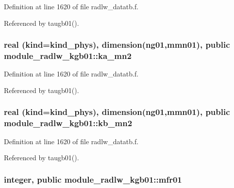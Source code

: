 Definition at line 1620 of file radlw\+\_\+datatb.\+f.



Referenced by taugb01().

\subsubsection[{\texorpdfstring{ka\+\_\+mn2}{ka_mn2}}]{\setlength{\rightskip}{0pt plus 5cm}real (kind=kind\+\_\+phys), dimension(ng01,{\bf mmn01}), public module\+\_\+radlw\+\_\+kgb01\+::ka\+\_\+mn2}\hypertarget{namespacemodule__radlw__kgb01_a0a4f08c625f2f25f132200811af42331}{}\label{namespacemodule__radlw__kgb01_a0a4f08c625f2f25f132200811af42331}


Definition at line 1620 of file radlw\+\_\+datatb.\+f.



Referenced by taugb01().

\subsubsection[{\texorpdfstring{kb\+\_\+mn2}{kb_mn2}}]{\setlength{\rightskip}{0pt plus 5cm}real (kind=kind\+\_\+phys), dimension(ng01,{\bf mmn01}), public module\+\_\+radlw\+\_\+kgb01\+::kb\+\_\+mn2}\hypertarget{namespacemodule__radlw__kgb01_ac357df5f66a7e384e22db58203ac294a}{}\label{namespacemodule__radlw__kgb01_ac357df5f66a7e384e22db58203ac294a}


Definition at line 1620 of file radlw\+\_\+datatb.\+f.



Referenced by taugb01().

\subsubsection[{\texorpdfstring{mfr01}{mfr01}}]{\setlength{\rightskip}{0pt plus 5cm}integer, public module\+\_\+radlw\+\_\+kgb01\+::mfr01}\hypertarget{namespacemodule__radlw__kgb01_a4bd2e710d96291436f9ee36e99816a19}{}\label{namespacemodule__radlw__kgb01_a4bd2e710d96291436f9ee36e99816a19}


